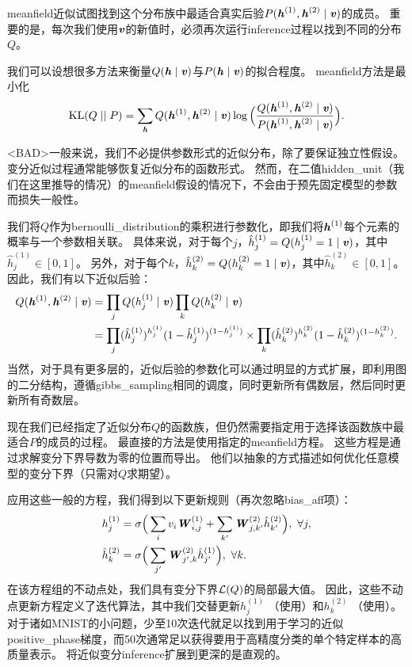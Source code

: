 \gls{meanfield}近似试图找到这个分布族中最适合真实后验$P(\boldsymbol{\mathit{h}}^{(1)}, \boldsymbol{\mathit{h}}^{(2)}  \mid  \boldsymbol{\mathit{v}})$的成员。
重要的是，每次我们使用$\boldsymbol{\mathit{v}}$的新值时，必须再次运行\gls{inference}过程以找到不同的分布$Q$。


我们可以设想很多方法来衡量$Q(\boldsymbol{\mathit{h}}  \mid  \boldsymbol{\mathit{v}})$与$P(\boldsymbol{\mathit{h}}  \mid  \boldsymbol{\mathit{v}})$的拟合程度。
\gls{meanfield}方法是最小化
\begin{align}
 \text{KL}(Q \mid  \mid P) = \sum_{\boldsymbol{\mathit{h}}} Q(\boldsymbol{\mathit{h}}^{(1)}, \boldsymbol{\mathit{h}}^{(2)}  \mid  \boldsymbol{\mathit{v}}) 
 \log \Big( \frac{Q(\boldsymbol{\mathit{h}}^{(1)}, \boldsymbol{\mathit{h}}^{(2)}  \mid  \boldsymbol{\mathit{v}})}{P(\boldsymbol{\mathit{h}}^{(1)}, \boldsymbol{\mathit{h}}^{(2)}  \mid  \boldsymbol{\mathit{v}})} \Big).
\end{align}

<BAD>一般来说，我们不必提供参数形式的近似分布，除了要保证独立性假设。
变分近似过程通常能够恢复近似分布的函数形式。
然而，在二值\gls{hidden_unit}（我们在这里推导的情况）的\gls{meanfield}假设的情况下，不会由于预先固定模型的参数而损失一般性。

我们将$Q$作为\gls{bernoulli_distribution}的乘积进行参数化，即我们将$\boldsymbol{\mathit{h}}^{(1)}$每个元素的概率与一个参数相关联。
具体来说，对于每个$j$，$\hat h_j^{(1)} = Q(h_j^{(1)}=1 \mid  \boldsymbol{\mathit{v}})$，其中$\hat h_j^{(1)} \in [0,1]$。
另外，对于每个$k$，$\hat h_k^{(2)} = Q(h_k^{(2)}=1 \mid  \boldsymbol{\mathit{v}})$，其中$\hat h_k^{(2)} \in [0,1]$。
因此，我们有以下近似后验：
\begin{align}
 Q(\boldsymbol{\mathit{h}}^{(1)}, \boldsymbol{\mathit{h}}^{(2)}  \mid  \boldsymbol{\mathit{v}}) &=  \prod_j Q(h_j^{(1)} \mid  \boldsymbol{\mathit{v}}) \prod_k Q(h_k^{(2)}  \mid  \boldsymbol{\mathit{v}}) \\
 &= \prod_j (\hat h_j^{(1)})^{h_j^{(1)}}(1-\hat h_j^{(1)})^{(1-h_j^{(1)})} \times
 \prod_k (\hat h_k^{(2)})^{h_k^{(2)}}(1-\hat h_k^{(2)})^{(1-h_k^{(2)})} .
\end{align}
当然，对于具有更多层的，近似后验的参数化可以通过明显的方式扩展，即利用图的二分结构，遵循\gls{gibbs_sampling}相同的调度，同时更新所有偶数层，然后同时更新所有奇数层。


现在我们已经指定了近似分布$Q$的函数族，但仍然需要指定用于选择该函数族中最适合$P$的成员的过程。
最直接的方法是使用指定的\gls{meanfield}方程。
这些方程是通过求解变分下界导数为零的位置而导出。
他们以抽象的方式描述如何优化任意模型的变分下界（只需对$Q$求期望）。

应用这些一般的方程，我们得到以下更新规则（再次忽略\gls{bias_aff}项）：
\begin{align} \label{eq:2033h1}
 h_j^{(1)} &= \sigma  \Big(  \sum_i v_i \boldsymbol{\mathit{W}}_{i,j}^{(1)} 
 + \sum_{k^{\prime}} \boldsymbol{\mathit{W}}_{j,k^{\prime}}^{(2)} \hat h_{k^{\prime}}^{(2)}  \Big), ~\forall j ,\\
 \label{eq:2034h2}
 \hat h_{k}^{(2)} &=  \sigma  \Big(  \sum_{j^{\prime}} \boldsymbol{\mathit{W}}_{j^{\prime},k}^{(2)}
 \hat h_{j^{\prime}}^{(1)}  \Big), ~\forall k.
\end{align}
在该方程组的不动点处，我们具有变分下界$\mathcal{L}(Q)$的局部最大值。
因此，这些不动点更新方程定义了迭代算法，其中我们交替更新$h_{j}^{(1)} $ （使用）和$h_{k}^{(2)} $ （使用）。
对于诸如MNIST的小问题，少至10次迭代就足以找到用于学习的近似\gls{positive_phase}梯度，而50次通常足以获得要用于高精度分类的单个特定样本的高质量表示。
将近似变分\gls{inference}扩展到更深的是直观的。


